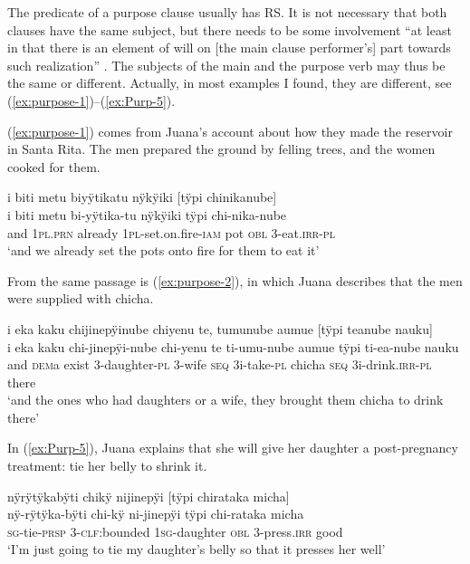 The predicate of a purpose clause usually has  RS. It is not necessary that both clauses have the same subject, but there needs to be some involvement “at least in that there is an element of will on [the main clause performer’s] part towards such realization” \citep[157]{Cristofaro2003}. The subjects of the main and the purpose verb may thus be the same or different. Actually, in most examples I found, they are different, see (\ref{ex:purpose-1})–(\ref{ex:Purp-5}).

(\ref{ex:purpose-1}) comes from Juana’s account about how they made the reservoir in Santa Rita. The men prepared the ground by felling trees, and the women cooked for them.

\ea\label{ex:purpose-1}
\begingl
\glpreamble i biti metu biyÿtikatu nÿkÿiki \textup{[}tÿpi chinikanube\textup{]}\\
\gla i biti metu bi-yÿtika-tu nÿkÿiki tÿpi chi-nika-nube\\
\glb and 1\textsc{pl.prn} already 1\textsc{pl}-set.on.fire-\textsc{iam} pot \textsc{obl} 3-eat.\textsc{irr}-\textsc{pl}\\
\glft ‘and we already set the pots onto fire for them to eat it’
\endgl
\trailingcitation{[jxx-p120515l-2.185-186]}
\xe

From the same passage is (\ref{ex:purpose-2}), in which Juana describes that the men were supplied with chicha.

\ea\label{ex:purpose-2}
\begingl
\glpreamble i eka kaku chijinepÿinube chiyenu te, tumunube aumue \textup{[}tÿpi teanube nauku\textup{]}\\
\gla i eka kaku chi-jinepÿi-nube chi-yenu te ti-umu-nube aumue tÿpi ti-ea-nube nauku\\
\glb and \textsc{dem}a exist 3-daughter-\textsc{pl} 3-wife \textsc{seq} 3i-take-\textsc{pl} chicha \textsc{seq} 3i-drink.\textsc{irr}-\textsc{pl} there\\
\glft ‘and the ones who had daughters or a wife, they brought them chicha to drink there’
\endgl
\trailingcitation{[jxx-p120515l-2.182-184]}
\xe

In (\ref{ex:Purp-5}), Juana explains that she will give her daughter a post-pregnancy treatment: tie her belly to shrink it.

\ea\label{ex:Purp-5}
\begingl
\glpreamble nÿrÿtÿkabÿti chikÿ nijinepÿi \textup{[}tÿpi chirataka micha\textup{]}\\
\gla nÿ-rÿtÿka-bÿti chi-kÿ ni-jinepÿi tÿpi chi-rataka micha\\
\textsc{sg}-tie-\textsc{prsp} 3-\textsc{clf:}bounded 1\textsc{sg}-daughter \textsc{obl} 3-press.\textsc{irr} good\\
\glft ‘I’m just going to tie my daughter’s belly so that it presses her well’
\endgl
\trailingcitation{[jxx-e120430l-2.1-2]}
\xe

